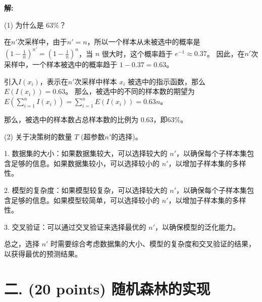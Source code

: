 \documentclass[8pt]{article}
\begin{document}
\textbf{\large 解:}

(1) 为什么是 $63\%$？

在$n'$次采样中，由于$n' = n$，所以一个样本从未被选中的概率是 $(1 - \frac{1}{n})^{n'} = (1 - \frac{1}{n})^{n}$，当 $n$ 很大时，这个概率趋于 $e^{-1} \approx 0.37$。
因此，在$n'$次采样中，一个样本被选中的概率趋于 $1 - 0.37 = 0.63$。

引入$I(x_i)$，表示在$n'$次采样中样本 $x_i$ 被选中的指示函数，那么 $E(I(x_i)) = 0.63$。
那么，被选中的不同的样本数的期望为$
E\left(\sum_{i=1}^{n}I(x_i)\right) 
= \sum_{i=1}^{n}E(I(x_i)) = 0.63n$。

那么，被选中的样本数占总样本数的比例为 $0.63$，即$63\%$。

(2) 关于决策树的数量 $T$ (超参数$n'$的选择)。

1. 数据集的大小：如果数据集较大，可以选择较大的 $n'$，以确保每个子样本集包含足够的信息。如果数据集较小，可以选择较小的 $n'$，以增加子样本集的多样性。

2. 模型的复杂度：如果模型较复杂，可以选择较大的 $n'$，以确保每个子样本集包含足够的信息。如果模型较简单，可以选择较小的 $n'$，以增加子样本集的多样性。

3. 交叉验证：可以通过交叉验证来选择最优的 $n'$，以确保模型的泛化能力。

总之，选择 $n'$ 时需要综合考虑数据集的大小、模型的复杂度和交叉验证的结果，以获得最优的预测结果。

\vspace{3em}

    





\section*{二. (20 points) 随机森林的实现}
\end{document}
